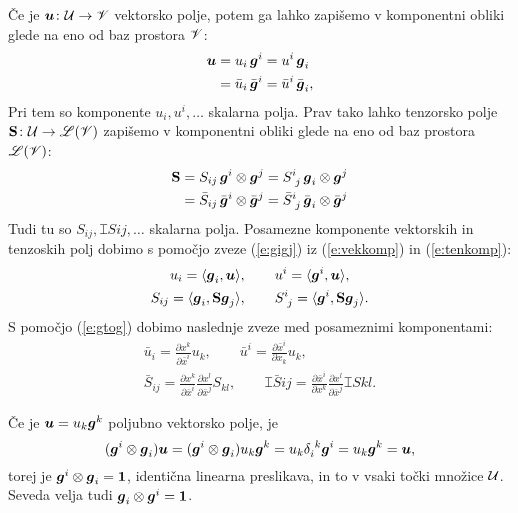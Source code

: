 Če je $\boldsymbol u\colon \mathcal U\to\mathscr V$ vektorsko polje, potem ga lahko zapišemo v komponentni
obliki glede na eno od baz prostora $\mathscr V$:
\begin{align}
	\boldsymbol u&=u_i\,\boldsymbol g^i=u^i\,\boldsymbol g_i \nonumber \\
	&=\bar{u}_i\,\bar{\boldsymbol g}^i=\bar{u}^i\,\bar{\boldsymbol g}_i, \label{e:vekkomp}
\end{align}
Pri tem so komponente $u_i,u^i,\dots$ skalarna polja.
Prav tako lahko tenzorsko polje $\mathbf S\colon \mathcal U\to\mathscr L(\mathscr V)$ zapišemo v
komponentni obliki glede na eno od baz prostora $\mathscr L(\mathscr V)$:
\begin{align}
	\ten{S}&=S_{ij}\,\vek{g}^i\otimes\vek{g}^j=\topbot{S}{i}{j}\,\vek{g}_i\otimes\vek{g}^j \nonumber \\
	&=\bar{S}_{ij}\,\bar{\vek{g}}^i\otimes\bar{\vek{g}}^j=
	\topbot{\bar{S}}{i}{j}\,\bar{\vek{g}}_i\otimes\bar{\vek{g}}^j \label{e:tenkomp}
\end{align}
Tudi tu so $S_{ij},\topbot{S}{i}{j},\dots$ skalarna polja.
Posamezne komponente vektorskih in tenzoskih polj dobimo s pomočjo zveze (\ref{e:gigj})
iz (\ref{e:vekkomp}) in (\ref{e:tenkomp}):
\begin{gather}
	u_i=\langle\vek{g}_i,\vek{u}\rangle,\qquad u^i=\langle\vek{g}^i,\vek{u}\rangle, \label{e:kompvek} \\
	S_{ij}=\langle\vek{g}_i,\ten{S}\vek{g}_j\rangle,\qquad\topbot{S}{i}{j}=\langle\vek{g}^i,\ten{S}\vek{g}_j\rangle.\label{e:kompten}
\end{gather}
S pomočjo (\ref{e:gtog}) dobimo naslednje zveze med posameznimi komponentami:
\begin{gather*}
	\bar{u}_i=\frac{\partial x^k}{\partial\bar{x}^i}u_k, \qquad
	\bar{u}^i=\frac{\partial\bar{x}^i}{\partial x_k}u_k, \\
	\bar{S}_{ij}=\frac{\partial x^k}{\partial\bar{x}^i}\frac{\partial x^l}{\partial\bar{x}^j}S_{kl}, \qquad
	\topbot{\bar{S}}{i}{j}=\frac{\partial\bar{x}^i}{\partial x^k}\frac{\partial x^l}{\partial\bar{x}^j}\topbot{S}{k}{l}.
\end{gather*}

Če je $\boldsymbol u=u_k\boldsymbol g^k$ poljubno vektorsko polje, je
\begin{equation} \label{e:iten}
	(\vek{g}^i\otimes\vek{g}_i)\vek{u}=(\vek{g}^i\otimes\vek{g}_i)u_k\vek{g}^k=
	u_k\bottop{\delta}{i}{k}\vek{g}^i=u_k\vek{g}^k=\vek{u},
\end{equation}
torej je $\boldsymbol g^i\otimes\boldsymbol g_i=\mathbf 1$, identična linearna preslikava, in to
v vsaki točki množice $\mathcal U$. Seveda velja tudi $\boldsymbol g_i\otimes\boldsymbol g^i=\mathbf 1$.


